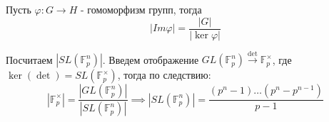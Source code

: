 \begin{cor}
	Пусть $\varphi: G \to H$ - гомоморфизм групп, тогда
	\[
	|Im\varphi| = \frac{|G|}{|\ker\varphi|}
	\]
\end{cor}

\begin{example}
	Посчитаем $|SL(\mathbb{F}_p^n)|$. Введем отображение $GL(\mathbb{F}_p^n) \overset{\det}{\to} \mathbb{F}_p^{\times}$,
 где $\ker\left(\det\right) = SL(\mathbb{F}_p^{\times})$, тогда по следствию:
	\[
	|\mathbb{F}_p^{\times}| = \frac{|GL(\mathbb{F}_p^n)|}{|SL(\mathbb{F}_p^n)|} \implies |SL(\mathbb{F}_p^n)
 | = \frac{(p^n - 1)\dots(p^n - p^{n-1})}{p-1}
	\]
\end{example}
